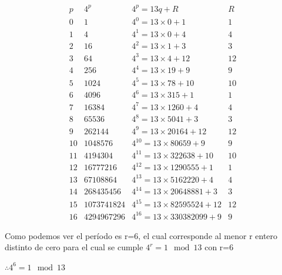  \[\begin{matrix}
         p  &   4^p & 4^p = 13 q                         + R    &   R   \\
         0  &   1   & 4^0 = 13\times0                    + 1    & 1     \\
         1  &   4   & 4^1 = 13\times0                    + 4    & 4     \\
         2  &   16  & 4^2 = 13\times1                    + 3    & 3     \\
         3  &   64  & 4^3 = 13\times4                    + 12   & 12    \\
         4  &   256  & 4^4 = 13\times19                  + 9    & 9     \\
         5  &   1024  & 4^5 = 13\times78                 + 10   & 10    \\
         6  &   4096  & 4^6 = 13\times315                + 1    & 1     \\
         7  &   16384  & 4^7 = 13\times1260              + 4    & 4     \\
         8  &   65536  & 4^8 = 13\times5041              + 3    & 3     \\
         9  &   262144  & 4^9 = 13\times20164            + 12   & 12    \\
         10 &   1048576  & 4^10 = 13\times80659          + 9    & 9     \\
         11 &   4194304  & 4^11 = 13\times322638         + 10   & 10    \\
         12 &   16777216  & 4^12 = 13\times1290555       + 1    & 1     \\
         13 &   67108864  & 4^13 = 13\times5162220       + 4    & 4     \\
         14 &   268435456  & 4^14 = 13\times20648881     + 3    & 3     \\
         15 &   1073741824  & 4^15 = 13\times82595524    + 12   & 12    \\
         16 &   4294967296  & 4^16 = 13\times330382099   + 9    & 9     
     \end{matrix}
 \]

 Como podemos ver el período es r=6, el cual corresponde al menor r entero distinto de cero para el cual se cumple $4^r=1 \mod 13$ con r=6

 $\therefore 4^6 = 1 \mod 13$


